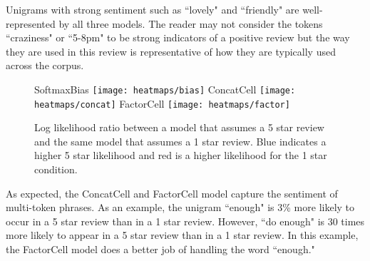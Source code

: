 Unigrams with strong sentiment such as ``lovely" and ``friendly" are well-represented by all three models. The reader may not consider the tokens ``craziness" or ``5-8pm" to be strong indicators of a positive review but the way they are used in this review is representative of how they are typically used across the corpus. 

\begin{figure}
\centering
SoftmaxBias
\texttt{[image: heatmaps/bias]}
ConcatCell
\texttt{[image: heatmaps/concat]}
FactorCell
\texttt{[image: heatmaps/factor]}
\caption{Log likelihood ratio between a model that assumes a 5 star review and the same model that assumes a 1 star review. Blue indicates a higher 5 star likelihood and red is a higher likelihood for the 1 star condition.}
\label{table:heatmap}
\end{figure}

As expected, the ConcatCell and FactorCell model capture the sentiment of multi-token phrases. As an example, the unigram ``enough" is 3\% more likely to occur in a 5 star review than in a 1 star review. However, ``do enough" is 30 times more likely to appear in a 5 star review than in a 1 star review. In this example, the FactorCell model does a better job of handling the word ``enough."


